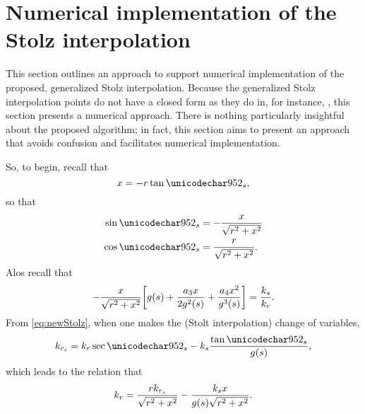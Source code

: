 \section{Numerical implementation of the Stolz interpolation}
\label{an:stolz}
This section outlines an approach to support numerical implementation of the proposed, generalized Stolz interpolation. Because the generalized Stolz interpolation points do not have a closed form as they do in, for instance, \cite{Cumming2005, Bamler1992}, this section presents a numerical approach. There is nothing particularly insightful about the proposed algorithm; in fact, this section aims to present an approach that avoids confusion and facilitates numerical implementation.
\par
So, to begin, recall that
\begin{equation}
 \xang = -\targetrange\tan\thetas,
\end{equation}
so that
\begin{align}
 \sin\thetas &= -\frac{\xang}{\sqrt{\targetrange^2+\xang^2}}\label{eq:angsin}\\
 \cos\thetas &= \frac{\targetrange}{\sqrt{\targetrange^2+\xang^2}}\label{eq:angcos}.
\end{align}
Alos recall that
\begin{equation}
 -\frac{x}{\sqrt{r^2+x^2}}\biggl[g(s)+\frac{a_3x}{2g^2(s)}+\frac{a_4x^2}{g^3(s)}\biggr] = \frac{k_{s}}{k_r}.
\end{equation}
From \eqref{eq:newStolz}, when one makes the (Stolt interpolation) change of variables,
\begin{equation}
 \krstolt = \kr\sec\thetas - \kparm\frac{\tan\thetas}{\gfunc(\parm)},
\end{equation}
which leads to the relation that
\begin{equation}
 k_r = \frac{rk_{r_s}}{\sqrt{r^2+x^2}} - \frac{k_{s}x}{g(s)\sqrt{r^2+x^2}}.
\end{equation}
